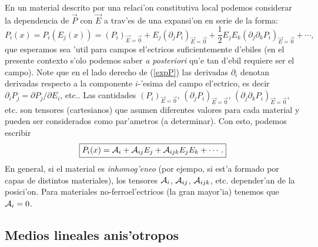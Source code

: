En un material descrito por una relaci'on constitutiva local podemos considerar
la dependencia de $\vec{P}$ con $\vec{E}$ a trav'es de una expansi'on en serie
de la forma:
\begin{equation}\label{expP}
P_i(x)=P_i(E_j(x))=(P_i)_{\vec{E}=\vec{0}}
+E_j(\partial_jP_i)_{\vec{E}=\vec{0}}+\frac{1}{2}
E_jE_k(\partial_j\partial_k P_i)_{\vec{E}=\vec{0}}+\cdots,
\end{equation}
que esperamos sea 'util para campos el'ectricos suficientemente d'ebiles (en el
presente contexto s'olo podemos saber \textit{a posteriori} qu'e tan d'ebil
requiere ser el campo). Note que en el lado derecho de (\ref{expP}) las derivadas $\partial_i$ denotan derivadas respecto a la componente $i$-'esima del campo el'ectrico, es decir $\partial_iP_j={\partial P_j}/{\partial E_i}$, etc.. Las cantidades $(P_i)_{\vec{E}=\vec{0}}$,
$(\partial_jP_i)_{\vec{E}=\vec{0}}$,
$(\partial_j\partial_k P_i)_{\vec{E}=\vec{0}}$, etc. son
tensores (cartesianos) que asumen diferentes valores para cada material y pueden ser
considerados como par'ametros (a determinar). Con esto, podemos escribir
\begin{equation}
\boxed{P_i(x)={\cal A}_i+{\cal A}_{ij}E_j+{\cal A}_{ijk}
E_jE_k+\cdots.}
\end{equation}
En general, si el material es \textit{inhomog'eneo} (por ejempo, si est'a formado por
capas de distintos materiales), los tensores ${\cal A}_i$, ${\cal A}_{ij}$, ${\cal A}_{ijk}$, etc. depender'an de la posici'on. Para materiales no-ferroel'ectricos (la gran mayor'ia) tenemos que ${\cal A}_i=0$.



\subsection{Medios lineales anis'otropos}\label{sec:aniso}

